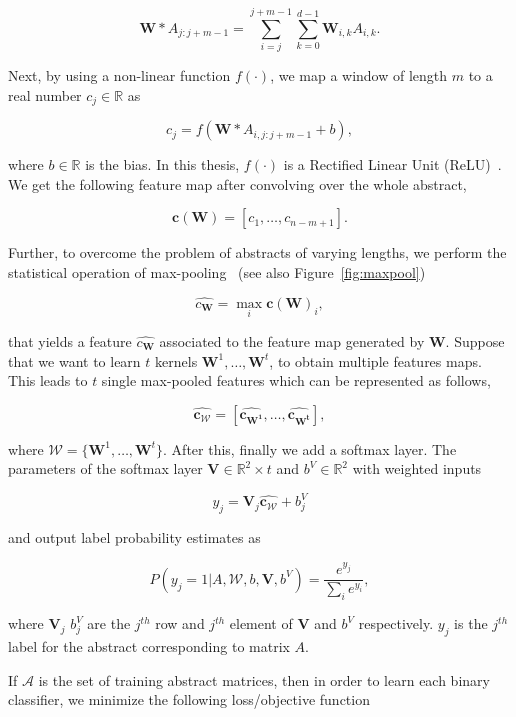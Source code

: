 \begin{center}
\[\mathbf{W} * A_{j:j+m-1} = \sum_{i=j}^{j+m-1} \sum_{k=0}^{d-1} \mathbf{W}_{i,k} A_{i,k}.
\]
\end{center}

Next, by using a non-linear function $f(\cdot)$, we map a window of length $m$ to a real number $c_j \in \mathbb{R}$ as 

\[c_j = f(\mathbf{W} * A_{i, j:j+m-1} + b),
\]
 
 where $b \in \mathbb{R}$ is the bias. In this thesis, $f(\cdot)$ is a Rectified Linear Unit (ReLU)~\cite{glorot2011deep, nair2010rectified}. We get the following feature map after convolving over the whole abstract,

 \[\mathbf{c(W)} = [c_1, \ldots, c_{n-m+1}].\]

 Further, to overcome the problem of abstracts of varying lengths, we perform the statistical operation of max-pooling~\cite{zhou1988image} (see also Figure~\ref{fig:maxpool})

 \[\widehat{c_{\mathbf{W}}} = \max_{i} \mathbf{c(W)}_i,\]

 that yields a feature $\widehat{c_{\mathbf{W}}}$ associated to the feature map generated by $\mathbf{W}$. Suppose that we want to learn $t$ kernels $\mathbf{W}^1, \ldots, \mathbf{W}^t$, to obtain multiple features maps. This leads to $t$ single max-pooled features which can be represented as follows,

 \[ \mathbf{\widehat{c_{\mathcal{W}}}} = [\mathbf{\widehat{c_{\mathbf{W}^1}}}, \ldots, \mathbf{\widehat{c_{\mathbf{W}^t}}}],
 \]

 where $\mathcal{W} = \{\mathbf{W}^1, \ldots, \mathbf{W}^t\}$. After this, finally we add a softmax layer. The parameters of the softmax layer $\mathbf{V} \in \mathbb{R}^2 \times t$ and $b^{V} \in \mathbb{R}^2$ with weighted inputs 

 \[y_j = \mathbf{V}_j \mathbf{\widehat{c_{\mathcal{W}}}} + b^{V}_j\]

and output label probability estimates as

\[P(y_j = 1 | A, \mathcal{W}, b, \mathbf{V}, b^{V}) = \frac{e^{y_j}}{\sum_i e^{y_i}},\]

where $\mathbf{V}_j$ $b^{V}_j$ are the $j^{th}$ row and $j^{th}$ element of $\mathbf{V}$ and $b^{V}$ respectively. $y_j$ is the $j^{th}$ label for the abstract corresponding to matrix $A$. 

If $\mathcal{A}$ is the set of training abstract matrices, then in order to learn each binary classifier, we minimize the following loss/objective function

